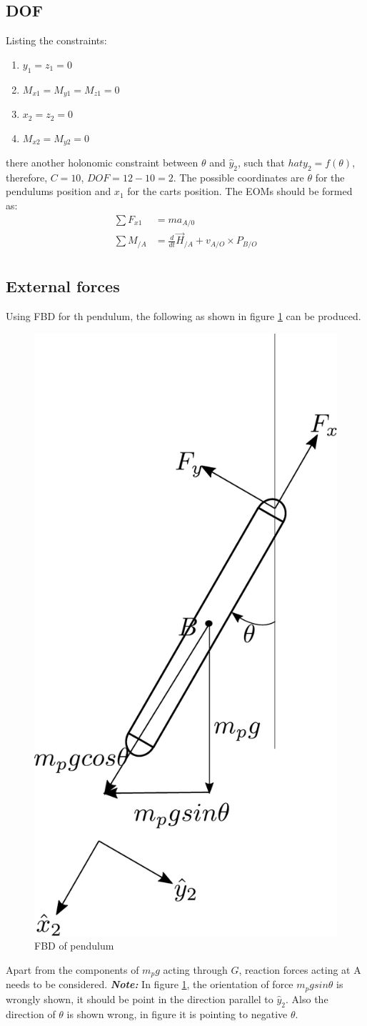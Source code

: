 \subsection{DOF}

Listing the constraints:
\begin{enumerate}
	\item $y_1 = z_1 = 0$
	\item $M_{x1} = M_{y1} = M_{z1} = 0$
	\item $x_2 = z_2 = 0$
	\item $M_{x2} = M_{y2} = 0$
\end{enumerate}
there another holonomic constraint between $\theta$ and $\hat{y}_{2}$, such that $hat{y}_{2} = f(\theta)$, therefore, $C = 10$, $DOF = 12 - 10 = 2$. The possible coordinates are $\theta$ for the pendulums position and $x_1$ for the carts position. The EOMs should be formed as:
\begin{align}
	\sum F_{x1} &= m a_{A/0} \\
	\sum M_{/A} &= \frac{d}{dt}\vec{H}_{/A}  + v_{A/O} \times P_{B/O} \\
\end{align}

\subsection{External forces}

Using FBD for th pendulum, the following as shown in figure \ref{fig_0_ch_5_cadtAndPendulum2} can be produced. 
\begin{figure}[h!]
	\centering
	\includegraphics[width=0.35\linewidth]{Bilder/28_CartWithPendulum_FBD_Pend.pdf}
	\caption{FBD of pendulum}
	\label{fig_0_ch_5_cadtAndPendulum2}
\end{figure}
Apart from the components of $m_{p}g$ acting through $G$, reaction forces acting at A needs to be considered.
\textbf{\textit{Note: }}In figure \ref{fig_0_ch_5_cadtAndPendulum2}, the orientation of force $m_{p}gsin\theta$ is wrongly shown, it should be point in the direction parallel to $\hat{y}_{2}$. Also the direction of $\theta$ is shown wrong, in figure it is pointing to negative $\theta$.

